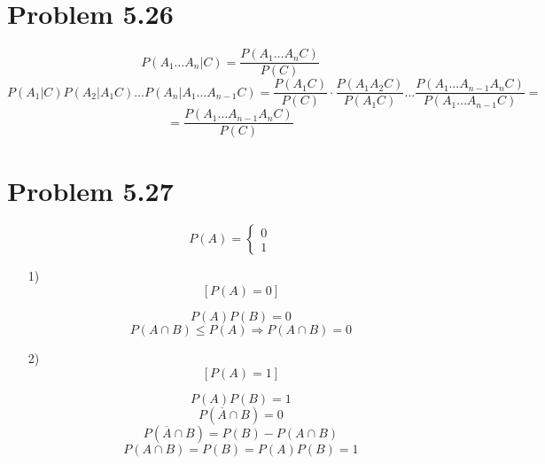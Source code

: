 \documentclass[12pt,letterpaper]{article}
\begin{document}

\section*{Problem 5.26}

\[ P(A_1 \dots A_n | C) = \frac{P(A_1 \dots A_n C)}{P(C)} \]
\[ P(A_1 | C) P(A_2 | A_1 C) \dots P(A_n | A_1 \dots A_{n-1} C) = \frac{P(A_1 C)}{P(C)}
    \cdot \frac{P(A_1 A_2 C)}{P(A_1 C)} \dots \frac{P(A_1 \dots A_{n-1} A_n C)}{P(A_1 \dots
    A_{n-1}C)} = 
\]
\[ = \frac{P(A_1 \dots A_{n-1} A_n C)}{P(C)}  \]



\section*{Problem 5.27}

\[ P(A) = \begin{cases}
    0 \\
    1
\end{cases}
\]

\begin{itemize}
    \item[1)]
        \[ [P(A) = 0] \]

        \[ P(A)P(B) = 0 \]
        \[ P(A \cap B) \leq P(A) \Rightarrow P(A \cap B) = 0 \]

    \item[2)]
        \[ [P(A) = 1] \]

        \[ P(A) P(B) = 1 \]
        \[ P(\overline A \cap B) = 0 \]
        \[ P(\overline A \cap B) = P(B) - P(A \cap B) \]
        \[ P(A \cap B) = P(B) = P(A) P(B) = 1 \]

\end{itemize}

\end{document}

